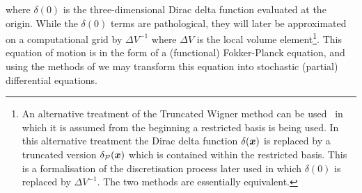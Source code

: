 where $\delta(0)$ is the three-dimensional Dirac delta function evaluated at the origin. While the $\delta(0)$ terms are pathological, they will later be approximated on a computational grid by $\Delta V^{-1}$ where $\Delta V$ is the local volume element\footnote{An alternative treatment of the Truncated Wigner method can be used~\citep{Norrie:2006vn,Norrie:2006kx} in which it is assumed from the beginning a restricted basis is being used.  In this alternative treatment the Dirac delta function $\delta(\bm{x})$ is replaced by a truncated version $\delta_\mathcal{P}(\bm{x})$ which is contained within the restricted basis. This is a formalisation of the discretisation process later used in which $\delta(0)$ is replaced by $\Delta V^{-1}$.  The two methods are essentially equivalent.}.  This equation of motion is in the form of a (functional) Fokker-Planck equation, and using the methods of  we may transform this equation into stochastic (partial) differential equations.


